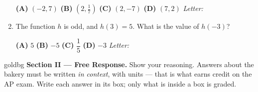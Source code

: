 \documentclass[10pt]{article}
\begin{document}
\begin{enumerate}[leftmargin=1.9em, itemsep=14pt]
      \smallskip
      \textbf{(A)} $(-2, 7)$ \hspace{2.6em} \textbf{(B)} $\left(2, \tfrac{1}{7}\right)$ \hspace{2.6em} \textbf{(C)} $(2, -7)$ \hspace{2.6em} \textbf{(D)} $(7, 2)$ \hfill\textit{Letter:}~\gradedblank[id=ap4, type=choice, points=1, answer=D]{0.42in}{13pt}

\item The function $h$ is odd, and $h(3) = 5$. What is the value of $h(-3)$?

      \smallskip
      \textbf{(A)} $5$ \hspace{2.6em} \textbf{(B)} $-5$ \hspace{2.6em} \textbf{(C)} $\dfrac{1}{5}$ \hspace{2.6em} \textbf{(D)} $-3$ \hfill\textit{Letter:}~\gradedblank[id=ap5, type=choice, points=1, answer=B]{0.42in}{13pt}

\end{enumerate}

\newpage

\begin{headlinebox}{goldbg}
\small
\textbf{Section II --- Free Response.} Show your reasoning. Answers about the bakery must be
written \emph{in context}, with units --- that is what earns credit on the AP exam. Write each answer in its box; only what is inside a box is graded.
\end{headlinebox}

\vspace{0.08in}
\end{document}
